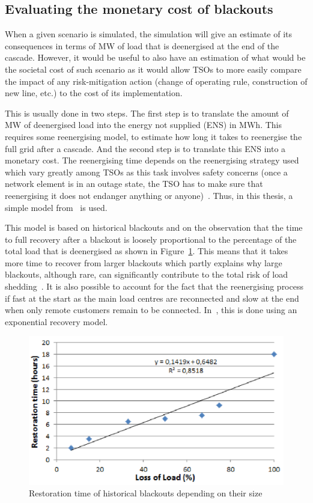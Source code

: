 \subsection{Evaluating the monetary cost of blackouts}
\label{sec:blackout_cost}

When a given scenario is simulated, the simulation will give an estimate of its consequences in terms of MW of load that is deenergised at the end of the cascade. However, it would be useful to also have an estimation of what would be the societal cost of such scenario as it would allow TSOs to more easily compare the impact of any risk-mitigation action (change of operating rule, construction of new line, etc.) to the cost of its implementation.

This is usually done in two steps. The first step is to translate the amount of MW of deenergised load into the energy not supplied (ENS) in MWh. This requires some reenergising model, \ie to estimate how long it takes to reenergise the full grid after a cascade. And the second step is to translate this ENS into a monetary cost. The reenergising time depends on the reenergising strategy used which vary greatly among TSOs as this task involves safety concerns (once a network element is in an outage state, the TSO has to make sure that reenergising it does not endanger anything or anyone)~\cite{ENTSOE-PSA_second_report}. Thus, in this thesis, a simple model from~\cite{TwoLevelPSA} is used.

This model is based on historical blackouts and on the observation that the time to full recovery after a blackout is loosely proportional to the percentage of the total load that is deenergised as shown in Figure~\ref{fig:restoration_time}. This means that it takes more time to recover from larger blackouts which partly explains why large blackouts, although rare, can significantly contribute to the total risk of load shedding~\cite{CascadingMethodoAndChallenges}. It is also possible to account for the fact that the reenergising process if fast at the start as the main load centres are reconnected and slow at the end when only remote customers remain to be connected. In~\cite{TwoLevelPSA}, this is done using an exponential recovery model.

\begin{figure}
    \centering
    \includegraphics[width=0.6\linewidth]{Figs/RestorationTime.png}
    \caption{Restoration time of historical blackouts depending on their size~\cite{TwoLevelPSA}}
    \label{fig:restoration_time}
\end{figure}

